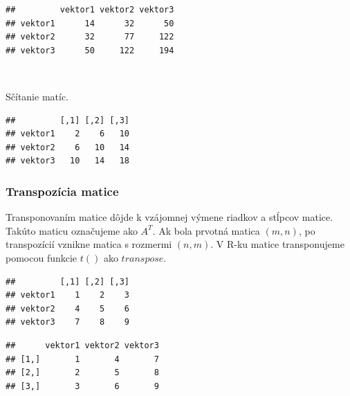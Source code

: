 \begin{verbatim}
##         vektor1 vektor2 vektor3
## vektor1      14      32      50
## vektor2      32      77     122
## vektor3      50     122     194
\end{verbatim}

~

Sčítanie matíc.

\begin{Shaded}
\begin{Highlighting}[]
\OperatorTok{+}\StringTok{ }
\end{Highlighting}
\end{Shaded}

\begin{verbatim}
##         [,1] [,2] [,3]
## vektor1    2    6   10
## vektor2    6   10   14
## vektor3   10   14   18
\end{verbatim}

\hypertarget{transpozuxedcia-matice}{%
\subsubsection{Transpozícia matice}\label{transpozuxedcia-matice}}

Transponovaním matice dôjde k vzájomnej výmene riadkov a stĺpcov matice.
Takúto maticu označujeme ako \(A^T\). Ak bola prvotná matica \((m, n)\),
po transpozícií vznikne matica s rozmermi \((n, m)\). V R-ku matice
transponujeme pomocou funkcie \(t()\) ako \(transpose\).

\begin{Shaded}
\begin{Highlighting}[]
\end{Highlighting}
\end{Shaded}

\begin{verbatim}
##         [,1] [,2] [,3]
## vektor1    1    2    3
## vektor2    4    5    6
## vektor3    7    8    9
\end{verbatim}

\begin{Shaded}
\begin{Highlighting}[]
\end{Highlighting}
\end{Shaded}

\begin{verbatim}
##      vektor1 vektor2 vektor3
## [1,]       1       4       7
## [2,]       2       5       8
## [3,]       3       6       9
\end{verbatim}


